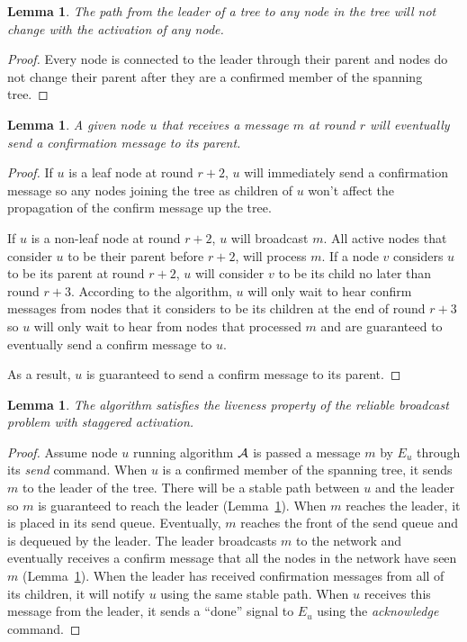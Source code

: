 \documentclass[english]{article}
\newtheorem{lemma}[theorem]{Lemma}
\begin{document}
\begin{lemma}
\label{StaggeredStablePath}
The path from the leader of a tree to any node in the tree will not change with the activation of any node.
\end{lemma}
\begin{proof}
Every node is connected to the leader through their parent and nodes do not change their parent after they are a confirmed member of the spanning tree.
\end{proof}

\begin{lemma}
\label{StaggeredSpanningTreePropagation}
A given node $u$ that receives a message $m$ at round $r$ will eventually send a confirmation message to its parent. 
\end{lemma}
\begin{proof}

 If $u$ is a leaf node at round $r+2$, $u$ will immediately send a confirmation message so any nodes joining the tree as children of $u$ won't affect the propagation of the confirm message up the tree. 

If $u$ is a non-leaf node at round $r+2$, $u$ will broadcast $m$. All active nodes that consider $u$ to be their parent before $r+2$, will process $m$. If a node $v$ considers $u$ to be its parent at round $r+2$, $u$ will consider $v$ to be its child no later than round $r+3$. According to the algorithm, $u$ will only wait to hear confirm messages from nodes that it considers to be its children at the end of round $r+3$ so $u$ will only wait to hear from nodes that processed $m$ and are guaranteed to eventually send a confirm message to $u$. 

As a result, $u$ is guaranteed to send a confirm message to its parent. 

\end{proof}

\begin{lemma}
\label{StaggeredRBLiveness}
The algorithm satisfies the liveness property of the reliable broadcast problem with staggered activation.
\end{lemma}
\begin{proof}

Assume node $u$ running algorithm $\cal A$ is passed a message $m$ by $E_u$ through its \textit{send} command. When $u$ is a confirmed member of the spanning tree, it sends $m$ to the leader of the tree. There will be a stable path between $u$ and the leader so $m$ is guaranteed to reach the leader (Lemma~\ref{StaggeredStablePath}). When $m$ reaches the leader, it is placed in its send queue. Eventually, $m$ reaches the front of the send queue and is dequeued by the leader. The leader broadcasts $m$ to the network and eventually receives a confirm message that all the nodes in the network have seen $m$ (Lemma~\ref{StaggeredSpanningTreePropagation}). When the leader has received confirmation messages from all of its children, it will notify $u$ using the same stable path. When $u$ receives this message from the leader, it sends  a ``done'' signal to $E_u$ using the \textit{acknowledge} command.

\end{proof}
\end{document}
